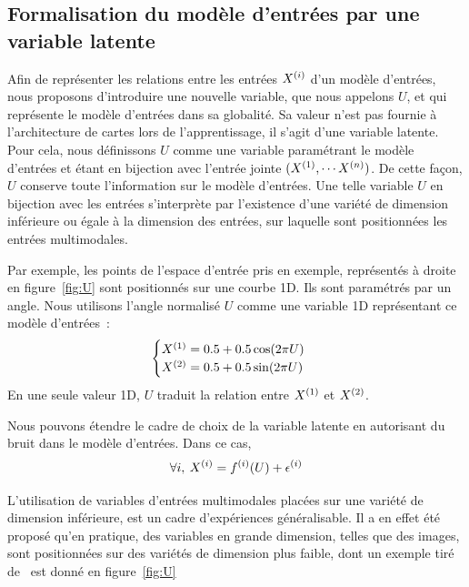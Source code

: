 \documentclass[../main]{subfiles}
\begin{document}
\subsection{Formalisation du modèle d'entrées par une variable latente}\label{sec:U}

Afin de représenter les relations entre les entrées $X^{({i})}$ d'un modèle d'entrées, nous proposons d'introduire une nouvelle variable, que nous appelons $U$, et qui représente le modèle d'entrées dans sa globalité.
Sa valeur n'est pas fournie à l'architecture de cartes lors de l'apprentissage, il s'agit d'une variable latente.
Pour cela, nous définissons $U$ comme une variable paramétrant le modèle d'entrées et étant en bijection avec l'entrée jointe $(X^{({1})}, \cdots X^{({n})})$. 
De cette façon, $U$ conserve toute l'information sur le modèle d'entrées.
Une telle variable $U$ en bijection avec les entrées s'interprète par l'existence d'une variété de dimension inférieure ou égale à la dimension des entrées, sur laquelle sont positionnées les entrées multimodales.

Par exemple, les points de l'espace d'entrée pris en exemple, représentés à droite en figure~\ref{fig:U} sont positionnés sur une courbe 1D. Ils sont paramétrés par un angle.
Nous utilisons l'angle normalisé $U$ comme une variable 1D représentant ce modèle d'entrées~:
\begin{equation}
 \begin{cases}
     X^{({1})}= 0.5 + 0.5  \cos(2\pi U)\\
     X^{({2})} = 0.5 + 0.5 \sin(2 \pi U)
    \end{cases}\,
\end{equation}
En une seule valeur 1D, $U$ traduit la relation entre $X^{({1})}$ et $X^{({2})}$.

Nous pouvons étendre le cadre de choix de la variable latente en autorisant du bruit dans le modèle d'entrées.
Dans ce cas, 
\begin{equation}
    \forall i, \: X^{({i})} = f^{({i})}(U) + \epsilon^{({i})}
\end{equation}

L'utilisation de variables d'entrées multimodales placées sur une variété de dimension inférieure, est un cadre d'expériences généralisable. 
Il a en effet été proposé qu'en pratique, des variables en grande dimension, telles que des images, sont positionnées sur des variétés de dimension plus faible, dont un exemple tiré de~\cite{Pless2009ASO} est donné en figure~\ref{fig:U} 
\end{document}

